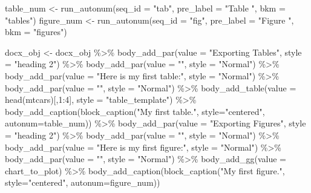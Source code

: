 \documentclass[
]{book}
\newenvironment{Shaded}{\begin{snugshade}}{\end{snugshade}}
\newcommand{\AttributeTok}[1]{\textcolor[rgb]{0.77,0.63,0.00}{#1}}
\newcommand{\DecValTok}[1]{\textcolor[rgb]{0.00,0.00,0.81}{#1}}
\newcommand{\FunctionTok}[1]{\textcolor[rgb]{0.00,0.00,0.00}{#1}}
\newcommand{\NormalTok}[1]{#1}
\newcommand{\OtherTok}[1]{\textcolor[rgb]{0.56,0.35,0.01}{#1}}
\newcommand{\SpecialCharTok}[1]{\textcolor[rgb]{0.00,0.00,0.00}{#1}}
\newcommand{\StringTok}[1]{\textcolor[rgb]{0.31,0.60,0.02}{#1}}
\begin{document}
\begin{Shaded}
\begin{Highlighting}[]
\NormalTok{table\_num }\OtherTok{\textless{}{-}} \FunctionTok{run\_autonum}\NormalTok{(}\AttributeTok{seq\_id =} \StringTok{"tab"}\NormalTok{, }\AttributeTok{pre\_label =} \StringTok{"Table "}\NormalTok{, }\AttributeTok{bkm =} \StringTok{"tables"}\NormalTok{)}
\NormalTok{figure\_num }\OtherTok{\textless{}{-}} \FunctionTok{run\_autonum}\NormalTok{(}\AttributeTok{seq\_id =} \StringTok{"fig"}\NormalTok{, }\AttributeTok{pre\_label =} \StringTok{"Figure "}\NormalTok{, }\AttributeTok{bkm =} \StringTok{"figures"}\NormalTok{)}

\NormalTok{docx\_obj }\OtherTok{\textless{}{-}}\NormalTok{ docx\_obj }\SpecialCharTok{\%\textgreater{}\%} 
  \FunctionTok{body\_add\_par}\NormalTok{(}\AttributeTok{value =} \StringTok{"Exporting Tables"}\NormalTok{, }\AttributeTok{style =} \StringTok{"heading 2"}\NormalTok{) }\SpecialCharTok{\%\textgreater{}\%} 
  \FunctionTok{body\_add\_par}\NormalTok{(}\AttributeTok{value =} \StringTok{""}\NormalTok{, }\AttributeTok{style =} \StringTok{"Normal"}\NormalTok{) }\SpecialCharTok{\%\textgreater{}\%} 
  \FunctionTok{body\_add\_par}\NormalTok{(}\AttributeTok{value =} \StringTok{"Here is my first table:"}\NormalTok{, }\AttributeTok{style =} \StringTok{"Normal"}\NormalTok{) }\SpecialCharTok{\%\textgreater{}\%} 
  \FunctionTok{body\_add\_par}\NormalTok{(}\AttributeTok{value =} \StringTok{""}\NormalTok{, }\AttributeTok{style =} \StringTok{"Normal"}\NormalTok{) }\SpecialCharTok{\%\textgreater{}\%} 
  \FunctionTok{body\_add\_table}\NormalTok{(}\AttributeTok{value =} \FunctionTok{head}\NormalTok{(mtcars)[,}\DecValTok{1}\SpecialCharTok{:}\DecValTok{4}\NormalTok{], }\AttributeTok{style =} \StringTok{"table\_template"}\NormalTok{) }\SpecialCharTok{\%\textgreater{}\%} 
  \FunctionTok{body\_add\_caption}\NormalTok{(}\FunctionTok{block\_caption}\NormalTok{(}\StringTok{"My first table."}\NormalTok{, }\AttributeTok{style=}\StringTok{"centered"}\NormalTok{, }\AttributeTok{autonum=}\NormalTok{table\_num)) }\SpecialCharTok{\%\textgreater{}\%} 
  \FunctionTok{body\_add\_par}\NormalTok{(}\AttributeTok{value =} \StringTok{"Exporting Figures"}\NormalTok{, }\AttributeTok{style =} \StringTok{"heading 2"}\NormalTok{) }\SpecialCharTok{\%\textgreater{}\%} 
  \FunctionTok{body\_add\_par}\NormalTok{(}\AttributeTok{value =} \StringTok{""}\NormalTok{, }\AttributeTok{style =} \StringTok{"Normal"}\NormalTok{) }\SpecialCharTok{\%\textgreater{}\%} 
  \FunctionTok{body\_add\_par}\NormalTok{(}\AttributeTok{value =} \StringTok{"Here is my first figure:"}\NormalTok{, }\AttributeTok{style =} \StringTok{"Normal"}\NormalTok{) }\SpecialCharTok{\%\textgreater{}\%} 
  \FunctionTok{body\_add\_par}\NormalTok{(}\AttributeTok{value =} \StringTok{""}\NormalTok{, }\AttributeTok{style =} \StringTok{"Normal"}\NormalTok{) }\SpecialCharTok{\%\textgreater{}\%} 
  \FunctionTok{body\_add\_gg}\NormalTok{(}\AttributeTok{value =}\NormalTok{ chart\_to\_plot) }\SpecialCharTok{\%\textgreater{}\%} 
  \FunctionTok{body\_add\_caption}\NormalTok{(}\FunctionTok{block\_caption}\NormalTok{(}\StringTok{"My first figure."}\NormalTok{, }\AttributeTok{style=}\StringTok{"centered"}\NormalTok{, }\AttributeTok{autonum=}\NormalTok{figure\_num))}


\end{Highlighting}
\end{Shaded}
\end{document}
